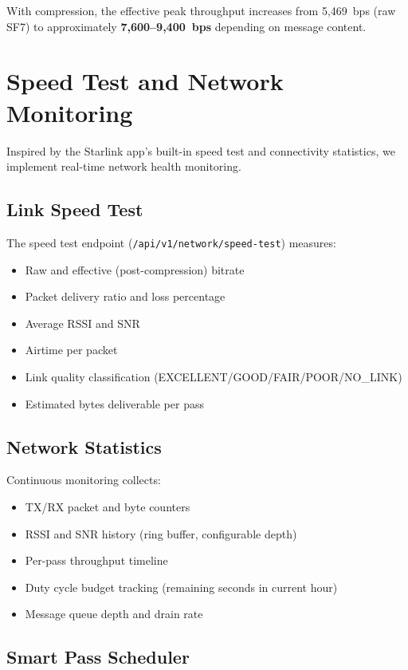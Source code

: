 \documentclass[11pt,a4paper]{article}
\begin{document}
With compression, the effective peak throughput increases from 5,469~bps (raw SF7) to approximately \textbf{7,600--9,400~bps} depending on message content.

\section{Speed Test and Network Monitoring}
\label{sec:speedtest}

Inspired by the Starlink app's built-in speed test and connectivity statistics, we implement real-time network health monitoring.

\subsection{Link Speed Test}

The speed test endpoint (\texttt{/api/v1/network/speed-test}) measures:
\begin{itemize}
    \item Raw and effective (post-compression) bitrate
    \item Packet delivery ratio and loss percentage
    \item Average RSSI and SNR
    \item Airtime per packet
    \item Link quality classification (EXCELLENT/GOOD/FAIR/POOR/NO\_LINK)
    \item Estimated bytes deliverable per pass
\end{itemize}

\subsection{Network Statistics}

Continuous monitoring collects:
\begin{itemize}
    \item TX/RX packet and byte counters
    \item RSSI and SNR history (ring buffer, configurable depth)
    \item Per-pass throughput timeline
    \item Duty cycle budget tracking (remaining seconds in current hour)
    \item Message queue depth and drain rate
\end{itemize}

\subsection{Smart Pass Scheduler}
\end{document}
